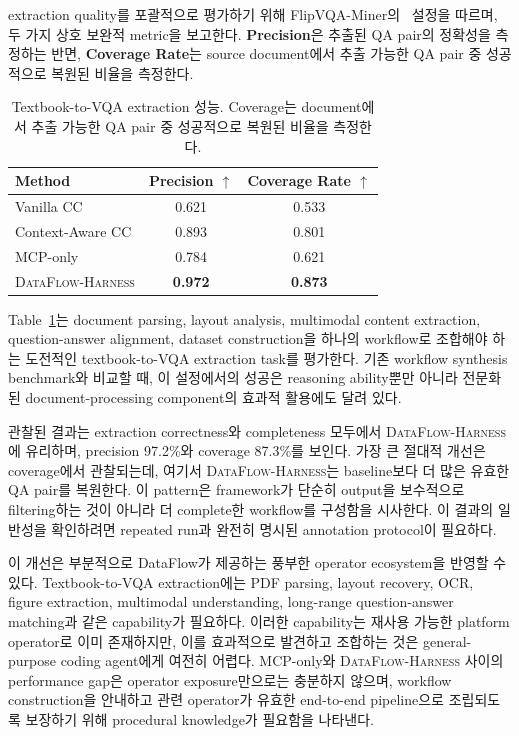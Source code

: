 extraction quality를 포괄적으로 평가하기 위해 FlipVQA-Miner의~\cite{wong2025flipvqa} 설정을 따르며, 두 가지 상호 보완적 metric을 보고한다. \textbf{Precision}은 추출된 QA pair의 정확성을 측정하는 반면,
\textbf{Coverage Rate}는 source document에서 추출 가능한 QA pair 중 성공적으로 복원된 비율을 측정한다.



\begin{table}[t]
\centering
\small
\setlength{\tabcolsep}{6pt}
\begin{tabular}{l|c|c}
\toprule
Method & Precision $\uparrow$ & Coverage Rate $\uparrow$ \\
\midrule
Vanilla CC & 0.621 & 0.533 \\
Context-Aware CC & 0.893 & 0.801 \\
MCP-only & 0.784 & 0.621 \\
\textsc{DataFlow-Harness} & \textbf{0.972} & \textbf{0.873} \\
\bottomrule
\end{tabular}
\caption{Textbook-to-VQA extraction 성능. Coverage는 document에서 추출 가능한 QA pair 중 성공적으로 복원된 비율을 측정한다.}
\label{tab:case_study}
\end{table}

Table~\ref{tab:case_study}는 document parsing, layout analysis, multimodal content extraction, question-answer alignment, dataset construction을 하나의 workflow로 조합해야 하는 도전적인 textbook-to-VQA extraction task를 평가한다. 기존 workflow synthesis benchmark와 비교할 때, 이 설정에서의 성공은 reasoning ability뿐만 아니라 전문화된 document-processing component의 효과적 활용에도 달려 있다.

관찰된 결과는 extraction correctness와 completeness 모두에서 \textsc{DataFlow-Harness}에 유리하며, precision 97.2\%와 coverage 87.3\%를 보인다. 가장 큰 절대적 개선은 coverage에서 관찰되는데, 여기서 \textsc{DataFlow-Harness}는 baseline보다 더 많은 유효한 QA pair를 복원한다. 이 pattern은 framework가 단순히 output을 보수적으로 filtering하는 것이 아니라 더 complete한 workflow를 구성함을 시사한다. 이 결과의 일반성을 확인하려면 repeated run과 완전히 명시된 annotation protocol이 필요하다.

이 개선은 부분적으로 DataFlow가 제공하는 풍부한 operator ecosystem을 반영할 수 있다. Textbook-to-VQA extraction에는 PDF parsing, layout recovery, OCR, figure extraction, multimodal understanding, long-range question-answer matching과 같은 capability가 필요하다. 이러한 capability는 재사용 가능한 platform operator로 이미 존재하지만, 이를 효과적으로 발견하고 조합하는 것은 general-purpose coding agent에게 여전히 어렵다. MCP-only와 \textsc{DataFlow-Harness} 사이의 performance gap은 operator exposure만으로는 충분하지 않으며, workflow construction을 안내하고 관련 operator가 유효한 end-to-end pipeline으로 조립되도록 보장하기 위해 procedural knowledge가 필요함을 나타낸다.

